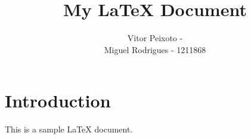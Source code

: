 \documentclass{article}
\begin{document}
\title{My LaTeX Document}
\author{Vitor Peixoto -  \\ Miguel Rodrigues - 1211868}

\maketitle

\section{Introduction}

This is a sample LaTeX document.
\end{document}
